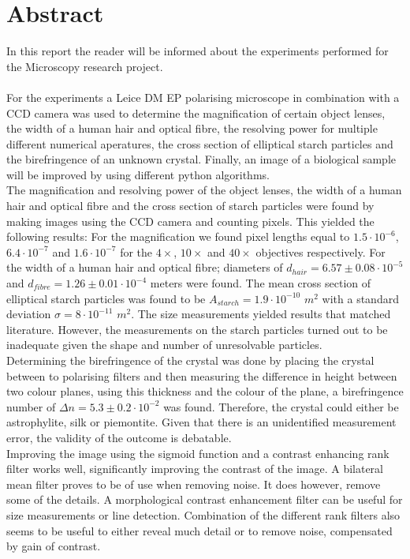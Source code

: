 \section*{Abstract}
In this report the reader will be informed about the experiments performed for the Microscopy research project.\\
\\
For the experiments a Leice DM EP polarising microscope in combination with a CCD camera was used to determine the magnification of certain object lenses, the width of a human hair and optical fibre, the resolving power for multiple different numerical aperatures, the cross section of elliptical starch particles and the birefringence of an unknown crystal. Finally, an image of a biological sample will be improved by using different python algorithms.\\
The magnification and resolving power of the object lenses, the width of a human hair and optical fibre and the cross section of starch particles were found by making images using the CCD camera and counting pixels. This yielded the following results: For the magnification we found pixel lengths equal to $1.5\cdot10^{-6}$, $6.4\cdot10^{-7}$ and $1.6\cdot10^{-7}$ for the $4\times$, $10\times$ and $40\times$ objectives respectively. For the width of a human hair and optical fibre; diameters of $d_{hair}=6.57\pm0.08\cdot10^{-5}$ and $d_{fibre} = 1.26\pm0.01\cdot10^{-4}$ meters were found. The mean cross section of elliptical starch particles was found to be $A_{starch}=1.9\cdot10^{-10}$ $m^2$ with a standard deviation $\sigma = 8 \cdot10^{-11}$ $m^2$. The size measurements yielded results that matched literature. However, the measurements on the starch particles turned out to be inadequate given the shape and number of unresolvable particles.\\
Determining the birefringence of the crystal was done by placing the crystal between to polarising filters and then measuring the difference in height between two colour planes, using this thickness and the colour of the plane, a birefringence number of $\Delta n = 5.3\pm0.2\cdot10^{-2}$ was found. Therefore, the crystal could either be astrophylite, silk or piemontite. Given that there is an unidentified measurement error, the validity of the outcome is debatable.\\
Improving the image using the sigmoid function and a contrast enhancing rank filter works well, significantly improving the contrast of the image. A bilateral mean filter proves to be of use when removing noise. It does however, remove some of the details. A morphological contrast enhancement filter can be useful for size measurements or line detection. Combination of the different rank filters also seems to be useful to either reveal much detail or to remove noise, compensated by gain of contrast.

